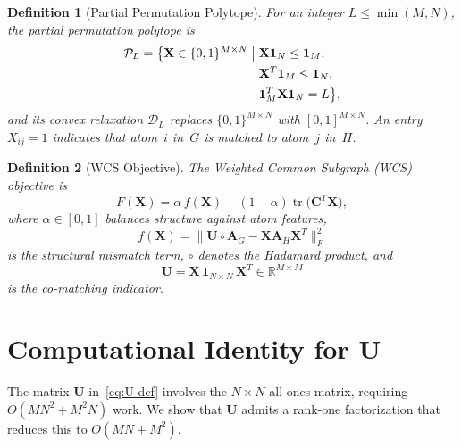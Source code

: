 \documentclass[conference]{IEEEtran}
\newtheorem{definition}{Definition}
\begin{document}
\begin{definition}[Partial Permutation Polytope]
\label{def:polytope}
For an integer $L \leq \min(M, N)$, the partial permutation polytope is
\begin{align}
\mathcal{P}_L = \big\{ \mathbf{X} \in \{0,1\}^{M \times N} \;\big|\;
  &\mathbf{X}\mathbf{1}_N \leq \mathbf{1}_M,\notag\\
  &\mathbf{X}^{T}\mathbf{1}_M \leq \mathbf{1}_N,\notag\\
  &\mathbf{1}_M^{T}\mathbf{X}\mathbf{1}_N = L \big\},
\label{eq:polytope}
\end{align}
and its convex relaxation $\mathcal{D}_L$ replaces $\{0,1\}^{M \times N}$ with $[0,1]^{M \times N}$.
An entry $X_{ij} = 1$ indicates that atom~$i$ in~$G$ is matched to atom~$j$ in~$H$.
\end{definition}

\begin{definition}[WCS Objective]
\label{def:wcs-objective}
The Weighted Common Subgraph (WCS) objective is
\begin{equation}
F(\mathbf{X}) = \alpha\, f(\mathbf{X})
  + (1 - \alpha)\operatorname{tr}\!\big(\mathbf{C}^{T}\!\mathbf{X}\big),
\label{eq:wcs-objective}
\end{equation}
where $\alpha \!\in\! [0,1]$ balances structure against atom features,
\begin{equation}
f(\mathbf{X})
  = \big\| \mathbf{U} \circ \mathbf{A}_G
    - \mathbf{X}\mathbf{A}_H\mathbf{X}^{T} \big\|_F^2
\label{eq:structural}
\end{equation}
is the structural mismatch term, $\circ$ denotes the Hadamard product, and
\begin{equation}
\mathbf{U}
  = \mathbf{X}\,\mathbf{1}_{N \times N}\,\mathbf{X}^{T}
  \in \mathbb{R}^{M \times M}
\label{eq:U-def}
\end{equation}
is the co-matching indicator.
\end{definition}


\section{Computational Identity for $\mathbf{U}$}
\label{sec:U-identity}

The matrix $\mathbf{U}$ in~\eqref{eq:U-def} involves the
$N \!\times\! N$ all-ones matrix, requiring $O(MN^2 + M^2 N)$ work.
We show that $\mathbf{U}$ admits a rank-one factorization
that reduces this to $O(MN + M^2)$.
\end{document}
